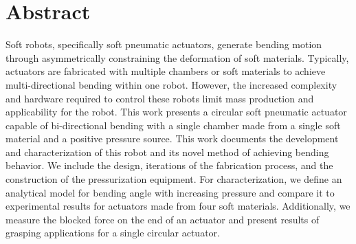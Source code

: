 \section*{Abstract}

Soft robots, specifically soft pneumatic actuators, generate bending motion through asymmetrically constraining the deformation of soft materials. Typically, actuators are fabricated with multiple chambers or soft materials to achieve multi-directional bending within one robot. However, the increased complexity and hardware required to control these robots limit mass production and applicability for the robot. This work presents a circular soft pneumatic actuator capable of bi-directional bending with a single chamber made from a single soft material and a positive pressure source. This work documents the development and characterization of this robot and its novel method of achieving bending behavior. We include the design, iterations of the fabrication process, and the construction of the pressurization equipment. For characterization, we define an analytical model for bending angle with increasing pressure and compare it to experimental results for actuators made from four soft materials. Additionally, we measure the blocked force on the end of an actuator and present results of grasping applications for a single circular actuator. 

